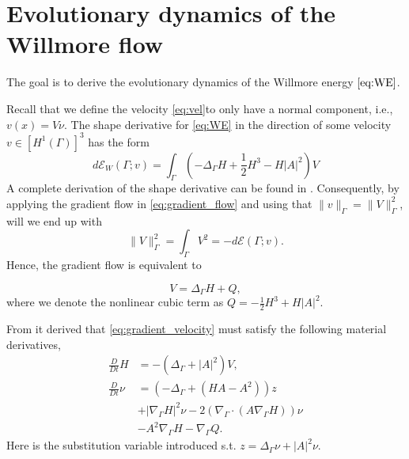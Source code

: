 

\section{Evolutionary dynamics of the Willmore flow}%
\label{sec:evolutionary_pde_s_of_the_willmore_flow}

The goal is to derive the evolutionary dynamics of the Willmore energy $\eqref{eq:WE} $.

Recall that we define the velocity \eqref{eq:vel}to only have a normal component, i.e., $v\left( x \right)  = V \nu $.
The shape derivative for \eqref{eq:WE} in the direction of some velocity $v \in \left[ H^{1}\left( \Gamma  \right)  \right]^3   $ has the form \[
d\mathcal{E}_{W} \left( \Gamma; v  \right)  = \int_{\Gamma }^{} \left( - \Delta _{\Gamma } H + \frac{1}{2} H^{3} - H \left\lvert A \right\rvert^2  \right) V
\]
A complete derivation of the shape derivative can be found in \cite[Corally 4.7]{dougan2012first}. Consequently, by applying the gradient flow in \eqref{eq:gradient_flow} and using that $\| v \|_{ \Gamma  }^{  }  = \| V \|_{ \Gamma   }^{2  }   $, will we end up with
\[
      \| V \|_{ \Gamma   }^{2  } = \int_{\Gamma }^{} V^2 = -d \mathcal{E} \left( \Gamma ;v \right).
\]
Hence, the gradient flow is equivalent to

\begin{equation}
\label{eq:gradient_velocity}
V  =   \Delta _{\Gamma } H + Q,
\end{equation}
\[
\]
where we denote the nonlinear cubic term as $Q  = - \frac{1}{2} H^{3} + H \left\lvert A \right\rvert^2$.

From \cite[Lemma 2.1]{kovacs2021convergent} it derived that \eqref{eq:gradient_velocity} must satisfy the following material derivatives,
\[
    \begin{split}
\frac{D}{Dt}H & = - \left( \Delta _{\Gamma } + \left\lvert A \right\rvert ^2   \right) V, \\
\frac{D}{Dt} \nu & = \left( -\Delta _{\Gamma } + \left( HA - A^2 \right)  \right) z  \\
&  + \left\lvert \nabla _{\Gamma } H \right\rvert ^2   \nu - 2\left( \nabla _{\Gamma }\cdot \left( A \nabla _{\Gamma } H \right)  \right) \nu  \\
  & -A^2 \nabla _{\Gamma } H  - \nabla _{\Gamma } Q.
    \end{split}
\]
Here is the substitution variable introduced s.t. $z = \Delta  _{\Gamma } \nu  + \left\lvert A \right\rvert ^2 \nu $.



